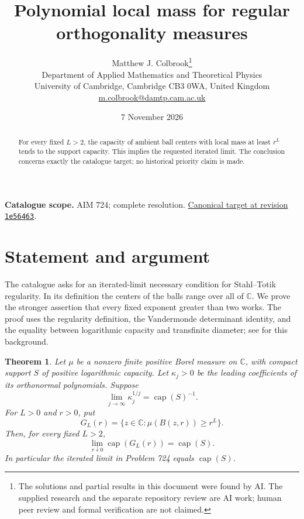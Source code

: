 \documentclass[11pt,a4paper]{article}
\newtheorem{theorem}{Theorem}[section]
\theoremstyle{remark}
\begin{document}
\title{Polynomial local mass for regular orthogonality measures}
\author{Matthew J. Colbrook\thanks{The solutions and partial results in this document were found by AI. The supplied research and the separate repository review are AI work; human peer review and formal verification are not claimed.}\\[4pt]
\small Department of Applied Mathematics and Theoretical Physics\\
\small University of Cambridge, Cambridge CB3 0WA, United Kingdom\\
\small\href{mailto:m.colbrook@damtp.cam.ac.uk}{m.colbrook@damtp.cam.ac.uk}}
\date{7 November 2026}
\maketitle
\begin{abstract}
For every fixed $L>2$, the capacity of ambient ball centers with local mass at least $r^L$ tends to the support capacity. This implies the requested iterated limit. The conclusion concerns exactly the catalogue target; no historical priority claim is made.
\end{abstract}
\noindent\textbf{Catalogue scope.} AIM 724; complete resolution. \href{https://github.com/MColbrook/AIM/blob/1e564633494c109edfd3ec46da1366adcff925a5/problems/724-is-polynomial-local-mass-almost-necessary-for-regular-orthogonal-polynomials.md}{Canonical target at revision \texttt{1e56463}}.


\section{Statement and argument}
\label{sec:724}

The catalogue asks for an iterated-limit necessary condition for Stahl--Totik regularity. In its definition the centers of the balls range over all of $\mathbb C$. We prove the stronger assertion that every fixed exponent greater than two works. The proof uses the regularity definition, the Vandermonde determinant identity, and the equality between logarithmic capacity and transfinite diameter; see \cite{StahlTotik,BloomVandermonde} for this background.

\begin{theorem}\label{thm:724}
Let $\mu$ be a nonzero finite positive Borel measure on $\mathbb C$, with compact support $S$ of positive logarithmic capacity. Let $\kappa_j>0$ be the leading coefficients of its orthonormal polynomials. Suppose
\[
 \lim_{j\to\infty}\kappa_j^{1/j}=\operatorname{cap}(S)^{-1}.
\]
For $L>0$ and $r>0$, put
\[
 G_L(r)=\{z\in\mathbb C:\mu(B(z,r))\ge r^L\}.
\]
Then, for every fixed $L>2$,
\[
 \lim_{r\downarrow0}\operatorname{cap}(G_L(r))
 =\operatorname{cap}(S).
\]
In particular the iterated limit in Problem 724 equals $\operatorname{cap}(S)$.
\end{theorem}
\end{document}
